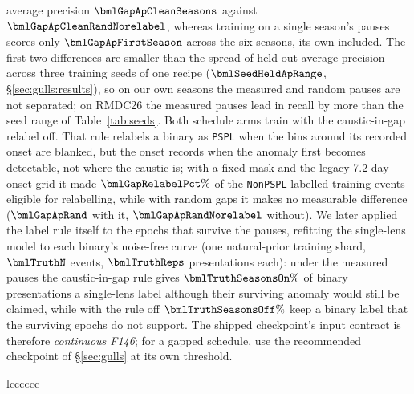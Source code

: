 average precision $\bmlGapApCleanSeasons$ against $\bmlGapApCleanRandNorelabel$, whereas training on a single season's
pauses scores only $\bmlGapApFirstSeason$ across the six seasons, its own included. The first two differences are smaller than the
spread of held-out average precision across three training seeds of one recipe ($\bmlSeedHeldApRange$,
\S\ref{sec:gulls:results}), so on our own seasons the measured and random pauses are not separated; on RMDC26 the measured pauses lead in recall by more than the seed range of Table~\ref{tab:seeds}. Both schedule arms
train with the caustic-in-gap relabel off. That rule relabels a binary as \texttt{PSPL} when the bins
around its recorded onset are blanked, but the onset records when the anomaly first becomes detectable,
not where the caustic is; with a fixed mask and the legacy 7.2-day onset grid it made
$\bmlGapRelabelPct\%$ of the \texttt{NonPSPL}-labelled training events eligible for relabelling, while
with random gaps it makes no measurable difference ($\bmlGapApRand$ with it, $\bmlGapApRandNorelabel$
without). We later applied the label rule itself to the epochs that survive the pauses, refitting the
single-lens model to each binary's noise-free curve (one natural-prior training shard, $\bmlTruthN$ events,
$\bmlTruthReps$ presentations each): under the measured pauses the caustic-in-gap rule gives
$\bmlTruthSeasonsOn\%$ of binary presentations a single-lens label although their surviving anomaly would
still be claimed, while with the rule off $\bmlTruthSeasonsOff\%$ keep a binary label that the surviving
epochs do not support. The shipped checkpoint's input contract is therefore \emph{continuous F146}; for a gapped
schedule, use the recommended checkpoint of \S\ref{sec:gulls} at its own threshold.

\begin{deluxetable*}{lcccccc}
\startdata

\enddata
{}
\end{deluxetable*}

